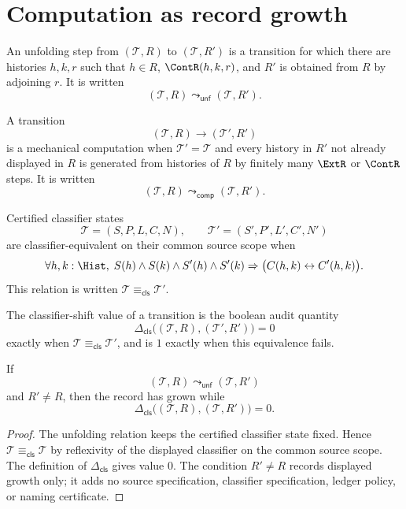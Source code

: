 \section{Computation as record growth}
\label{sec:classifier-level-information-computation}

\begin{definition}[Unfolding]
\label{def:classifier-level-unfolding}
An unfolding step from $(\mathcal T,R)$ to $(\mathcal T,R')$ is a transition
for which there are histories $h,k,r$ such that $h\in R$, $\ContR(h,k,r)$, and
$R'$ is obtained from $R$ by adjoining $r$. It is written
$$
(\mathcal T,R)\leadsto_{\mathsf{unf}}(\mathcal T,R').
$$
\end{definition}

\begin{definition}
\label{def:classifier-level-mechanical-computation}
A transition
$$
(\mathcal T,R)\longrightarrow(\mathcal T',R')
$$
is a mechanical computation when $\mathcal T'=\mathcal T$ and every history in
$R'$ not already displayed in $R$ is generated from histories of $R$ by finitely
many $\ExtR$ or $\ContR$ steps. It is written
$$
(\mathcal T,R)\leadsto_{\mathsf{comp}}(\mathcal T,R').
$$
\end{definition}

\begin{definition}
\label{def:classifier-level-classifier-equivalence}
Certified classifier states
$$
\mathcal T=(S,P,L,C,N),
\qquad
\mathcal T'=(S',P',L',C',N')
$$
are classifier-equivalent on their common source scope when
$$
\forall h,k:\Hist,\;
S(h)\land S(k)\land S'(h)\land S'(k)
\Rightarrow
\bigl(C(h,k)\leftrightarrow C'(h,k)\bigr).
$$
This relation is written $\mathcal T\equiv_{\mathsf{cls}}\mathcal T'$.
\end{definition}

\begin{definition}
\label{def:classifier-level-classifier-shift}
The classifier-shift value of a transition is the boolean audit quantity
$$
\Delta_{\mathsf{cls}}
\bigl((\mathcal T,R),(\mathcal T',R')\bigr)=0
$$
exactly when $\mathcal T\equiv_{\mathsf{cls}}\mathcal T'$, and is $1$
exactly when this equivalence fails.
\end{definition}

\begin{theorem}
\label{thm:record-growth-does-not-force-classifier-shift}
If
$$
(\mathcal T,R)\leadsto_{\mathsf{unf}}(\mathcal T,R')
$$
and $R'\neq R$, then the record has grown while
$$
\Delta_{\mathsf{cls}}\bigl((\mathcal T,R),(\mathcal T,R')\bigr)=0.
$$
\end{theorem}
\begin{proof}
The unfolding relation keeps the certified classifier state fixed. Hence
$\mathcal T\equiv_{\mathsf{cls}}\mathcal T$ by reflexivity of the displayed
classifier on the common source scope. The definition of
$\Delta_{\mathsf{cls}}$ gives value $0$. The condition $R'\neq R$ records
displayed growth only; it adds no source specification, classifier
specification, ledger policy, or naming certificate.
\end{proof}

